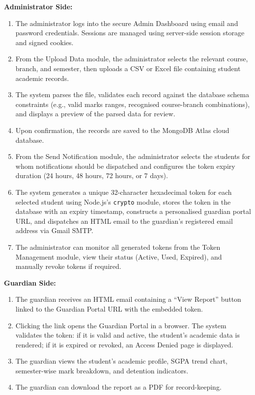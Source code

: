 \documentclass[12pt,a4paper]{report}
\begin{document}
\textbf{Administrator Side:}
\begin{enumerate}
  \item The administrator logs into the secure Admin Dashboard using email and password credentials. Sessions are managed using server-side session storage and signed cookies.
  \item From the Upload Data module, the administrator selects the relevant course, branch, and semester, then uploads a CSV or Excel file containing student academic records.
  \item The system parses the file, validates each record against the database schema constraints (e.g., valid marks ranges, recognised course-branch combinations), and displays a preview of the parsed data for review.
  \item Upon confirmation, the records are saved to the MongoDB Atlas cloud database.
  \item From the Send Notification module, the administrator selects the students for whom notifications should be dispatched and configures the token expiry duration (24 hours, 48 hours, 72 hours, or 7 days).
  \item The system generates a unique 32-character hexadecimal token for each selected student using Node.js's \texttt{crypto} module, stores the token in the database with an expiry timestamp, constructs a personalised guardian portal URL, and dispatches an HTML email to the guardian's registered email address via Gmail SMTP.
  \item The administrator can monitor all generated tokens from the Token Management module, view their status (Active, Used, Expired), and manually revoke tokens if required.
\end{enumerate}

\textbf{Guardian Side:}
\begin{enumerate}
  \item The guardian receives an HTML email containing a ``View Report'' button linked to the Guardian Portal URL with the embedded token.
  \item Clicking the link opens the Guardian Portal in a browser. The system validates the token: if it is valid and active, the student's academic data is rendered; if it is expired or revoked, an Access Denied page is displayed.
  \item The guardian views the student's academic profile, SGPA trend chart, semester-wise mark breakdown, and detention indicators.
  \item The guardian can download the report as a PDF for record-keeping.
\end{enumerate}
\end{document}
